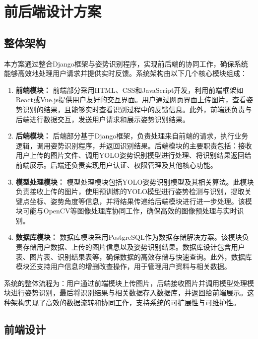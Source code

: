 \section{前后端设计方案}

\subsection{整体架构}

本方案通过整合Django框架与姿势识别程序，实现前后端的协同工作，确保系统能够高效地处理用户请求并提供实时反馈。系统架构由以下几个核心模块组成：

\begin{enumerate}
    \item \textbf{前端模块：}
    前端部分采用HTML、CSS和JavaScript开发，利用前端框架如React或Vue.js提供用户友好的交互界面。用户通过网页界面上传图片，查看姿势识别的结果，且能够实时查看识别过程中的反馈信息。此外，前端还负责与后端进行数据交互，发送用户请求和展示姿势识别结果。

    \item \textbf{后端模块：}
    后端部分基于Django框架，负责处理来自前端的请求，执行业务逻辑，调用姿势识别程序，并返回识别结果。后端模块的主要职责包括：接收用户上传的图片文件、调用YOLO姿势识别模型进行处理、将识别结果返回给前端展示。后端还负责实现用户认证、权限管理及其他核心功能。

    \item \textbf{模型处理模块：}
    模型处理模块包括YOLO姿势识别模型及其相关算法。此模块负责接收上传的图片，使用预训练的YOLO模型进行姿势检测与识别，提取关键点坐标、姿势角度等信息，并将结果传递给后端模块进行进一步处理。该模块可能与OpenCV等图像处理库协同工作，确保高效的图像预处理与实时识别。

    \item \textbf{数据库模块：}
    数据库模块采用PostgreSQL作为数据存储解决方案。该模块负责存储用户数据、上传的图片信息以及姿势识别结果。数据库设计包含用户表、图片表、识别结果表等，确保数据的高效存储与快速查询。此外，数据库模块还支持用户信息的增删改查操作，用于管理用户资料与相关数据。
\end{enumerate}

系统的整体流程为：用户通过前端模块上传图片，后端接收图片并调用模型处理模块进行姿势识别，最后将识别结果与相关数据存入数据库，并返回给前端展示。这种架构实现了高效的数据流转和协同工作，支持系统的可扩展性与可维护性。


\subsection{前端设计}

